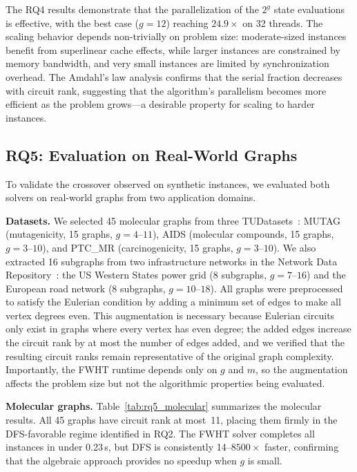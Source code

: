 \documentclass[acmsmall,review]{acmart}
\begin{document}
	The RQ4 results demonstrate that the parallelization of the $2^g$ state evaluations is effective, with the best case ($g = 12$) reaching $24.9\times$ on 32 threads. The scaling behavior depends non-trivially on problem size: moderate-sized instances benefit from superlinear cache effects, while larger instances are constrained by memory bandwidth, and very small instances are limited by synchronization overhead. The Amdahl's law analysis confirms that the serial fraction decreases with circuit rank, suggesting that the algorithm's parallelism becomes more efficient as the problem grows---a desirable property for scaling to harder instances.
	
	\subsection{RQ5: Evaluation on Real-World Graphs}
	\label{subsec:rq5}

	To validate the crossover observed on synthetic instances, we evaluated both solvers on real-world graphs from two application domains.

	\textbf{Datasets.} We selected 45 molecular graphs from three TUDatasets~\cite{TUDatasets}: MUTAG (mutagenicity, 15 graphs, $g = 4$--$11$), AIDS (molecular compounds, 15 graphs, $g = 3$--$10$), and PTC\_MR (carcinogenicity, 15 graphs, $g = 3$--$10$). We also extracted 16 subgraphs from two infrastructure networks in the Network Data Repository~\cite{NetworkRepository}: the US Western States power grid (8 subgraphs, $g = 7$--$16$) and the European road network (8 subgraphs, $g = 10$--$18$). All graphs were preprocessed to satisfy the Eulerian condition by adding a minimum set of edges to make all vertex degrees even. This augmentation is necessary because Eulerian circuits only exist in graphs where every vertex has even degree; the added edges increase the circuit rank by at most the number of edges added, and we verified that the resulting circuit ranks remain representative of the original graph complexity. Importantly, the FWHT runtime depends only on $g$ and $m$, so the augmentation affects the problem size but not the algorithmic properties being evaluated.

	\textbf{Molecular graphs.} Table~\ref{tab:rq5_molecular} summarizes the molecular results. All 45 graphs have circuit rank at most~11, placing them firmly in the DFS-favorable regime identified in RQ2. The FWHT solver completes all instances in under 0.23\,s, but DFS is consistently 14--$8500\times$ faster, confirming that the algebraic approach provides no speedup when $g$ is small.
\end{document}
